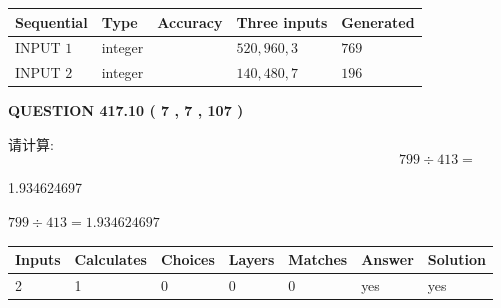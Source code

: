 \documentclass{ctexart}
\begin{document}
  
\noindent\begin{tabular}{|l|l|l|l|l|}
\hline
 Sequential & Type & Accuracy & Three inputs & Generated \\ 
\hline
 
 
  INPUT $  1 $ & integer &  & $
 520
 , 
 960
 , 
 3
 $ & $ 769 $ 
 \\  \hline  
 
 
  INPUT $  2 $ & integer &  & $
 140
 , 
 480
 , 
 7
 $ & $ 196 $ 
 \\  \hline  
 \end{tabular}
   
   
  
\vspace{0.2in}
  
{\textbf{\Large{QUESTION
417.10 
 ( 7 , 7 , 107 )
}}}
  
  
 
请计算:
\begin{equation}
799  \div    %
413 = \nonumber
\end{equation}
 
 
 
\noindent{}
 
 

1.934624697
 
 
\noindent{}
 
 

 
 
 
\noindent{}
 
 

$ %
799 \div  %
413=   %
1.934624697$
 
 
\noindent{}
 
 

 
   
   
   
   
\noindent\begin{tabular}{|l|l|l|l|l|l|l|}
 \hline
Inputs & Calculates & Choices & Layers & Matches & Answer & Solution \\ \hline
 2  & 
 1  & 
 0
  & 
 0  & 
 0  & 
  yes & 
  yes 
  \\ \hline
 \end{tabular}
   
\end{document}
